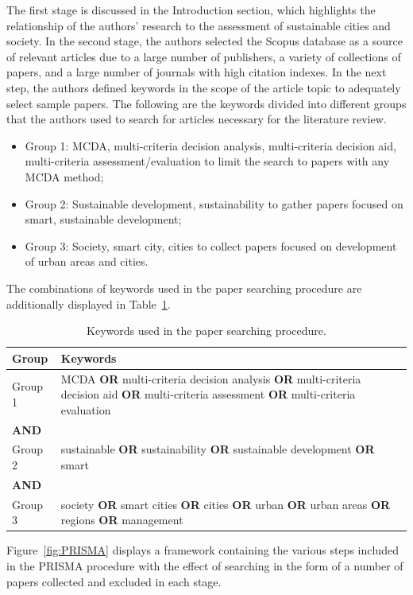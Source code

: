 \documentclass[final,5p,times,twocolumn,authoryear]{elsarticle}
\begin{document}
The first stage is discussed in the Introduction section, which highlights the relationship of the authors' research to the assessment of sustainable cities and society. In the second stage, the authors selected the Scopus database as a source of relevant articles due to a large number of publishers, a variety of collections of papers, and a large number of journals with high citation indexes. In the next step, the authors defined keywords in the scope of the article topic to adequately select sample papers. The following are the keywords divided into different groups that the authors used to search for articles necessary for the literature review.
%
\begin{itemize}
    \item {Group 1: MCDA, multi-criteria decision analysis, multi-criteria decision aid, multi-criteria assessment/evaluation to limit the search to papers with any MCDA method;}
    \item {Group 2: Sustainable development, sustainability to gather papers focused on smart, sustainable development;}
    \item {Group 3: Society, smart city, cities to collect papers focused on development of urban areas and cities.}
\end{itemize}
%
The combinations of keywords used in the paper searching procedure are additionally displayed in Table~\ref{tab:prismakeywords}.
%
\begin{table}[H]
\centering
\caption{Keywords used in the paper searching procedure.}
\label{tab:prismakeywords}
\begin{tabular}{lp{5cm}} \toprule
Group & Keywords \\ \midrule
Group 1 & MCDA \textbf{OR} multi-criteria decision analysis \textbf{OR} multi-criteria decision aid \textbf{OR} multi-criteria assessment \textbf{OR} multi-criteria evaluation \\
\textbf{AND} &  \\
Group 2 & sustainable \textbf{OR} sustainability \textbf{OR} sustainable development \textbf{OR} smart \\
\textbf{AND} &  \\
Group 3 & society \textbf{OR} smart cities \textbf{OR} cities \textbf{OR} urban \textbf{OR} urban areas \textbf{OR} regions \textbf{OR} management \\ \bottomrule
\end{tabular}
\end{table}
%
Figure~\ref{fig:PRISMA} displays a framework containing the various steps included in the PRISMA procedure with the effect of searching in the form of a number of papers collected and excluded in each stage.
\end{document}
